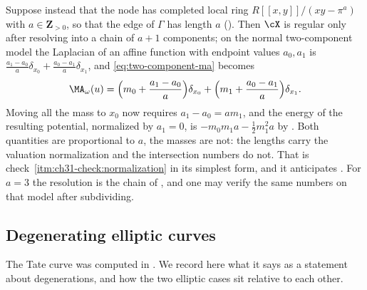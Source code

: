 \begin{example}
\label{ex:ch31-nodal-thickness}
Suppose instead that the node has completed local ring
\(R[[x,y]]/(xy-\pi^a)\) with \(a\in\mathbf Z_{>0}\), so that the edge of
\(\Gamma\) has length \(a\) ().  Then \(\cX\) is
regular only after resolving into a chain of \(a+1\) components; on the
normal two-component model the Laplacian of an affine function
with endpoint values \(a_0,a_1\) is
\(\tfrac{a_1-a_0}{a}\delta_{x_0}+\tfrac{a_0-a_1}{a}\delta_{x_1}\), and
\eqref{eq:two-component-ma} becomes
\[
 \MA_\omega(u)=\Bigl(m_0+\frac{a_1-a_0}{a}\Bigr)\delta_{x_0}
              +\Bigl(m_1+\frac{a_0-a_1}{a}\Bigr)\delta_{x_1}.
\]
Moving all the mass to \(x_0\) now requires \(a_1-a_0=am_1\), and the energy
of the resulting potential, normalized by \(a_1=0\), is
\(-m_0m_1a-\tfrac12m_1^2a\) by .  Both
quantities are proportional to \(a\), the masses are not: the lengths carry
the valuation normalization and the intersection numbers do not.  That is
check~\cref{itm:ch31-check:normalization} in its simplest form, and it
anticipates .  For \(a=3\) the resolution is the
chain of , and one may verify the same numbers on
that model after subdividing.
\end{example}

\subsection{Degenerating elliptic curves}
\label{sec:ch31-elliptic}

The Tate curve was computed in .  We record here what
it says as a statement about degenerations, and how the two elliptic cases
sit relative to each other.

